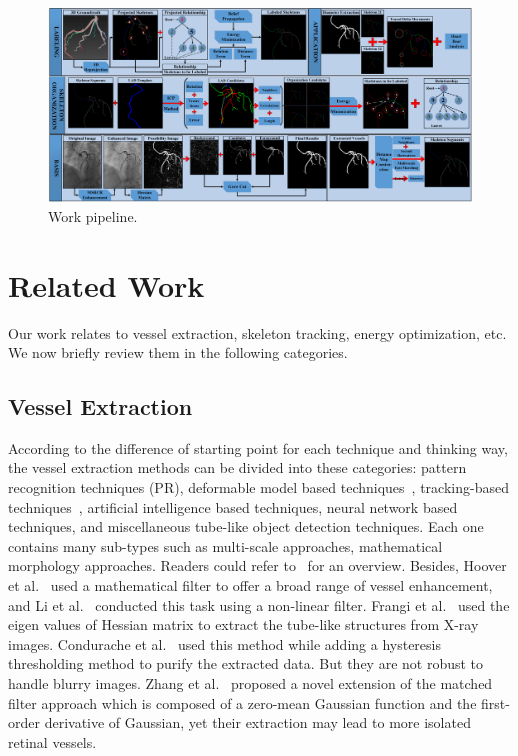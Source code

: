 \documentclass[journal]{IEEEtran}
\begin{document}
\begin{figure}[!t]
\centering
\includegraphics[width=1.0\linewidth]{./images/pipeline.png}
\caption{Work pipeline.}
\label{fig:pipeline}
\end{figure}

\section{Related Work}
\label{sec:related-work}
Our work relates to vessel extraction, skeleton tracking, energy optimization, etc. We now briefly review them in the following categories.

\subsection{Vessel Extraction}
According to the difference of starting point for each technique and thinking way, the vessel extraction methods can be divided into these categories: pattern recognition techniques (PR), deformable model based techniques~\cite{Deformable2}\cite{Deformable3}, tracking-based techniques~\cite{Tracking2}\cite{Tracking3}\cite{Tracking5},
artificial intelligence based techniques, neural network based
techniques, and miscellaneous tube-like object detection techniques.
Each one contains many sub-types such as multi-scale approaches,
mathematical morphology approaches. Readers could refer
to~\cite{Kirbas} for an overview. Besides, Hoover et al.~\cite{Hoover}
used a mathematical filter to offer a broad range of vessel
enhancement, and Li et al.~\cite{Li} conducted this task using a
non-linear filter. Frangi et al.~\cite{Frangi} used the eigen values
of Hessian matrix to extract the tube-like structures from X-ray
images. Condurache et al.~\cite{Condurache} used this method while
adding a hysteresis thresholding method to purify the extracted data.
But they are not robust to handle blurry images. Zhang et
al.~\cite{Zhang2010438} proposed a novel extension of the matched
filter approach which is composed of a zero-mean Gaussian function
and the first-order derivative of Gaussian,
yet their extraction may lead to more isolated retinal vessels.
\end{document}
